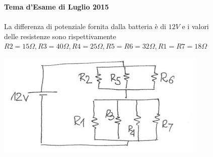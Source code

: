 \begin{figure}[h!]
\textbf{Tema d'Esame di Luglio 2015}\\ \\
La differenza di potenziale fornita dalla batteria è di $12V$ e i valori delle resistenze sono rispettivamente $R2=15\Omega, R3=40\Omega, R4=25\Omega, R5=R6=32\Omega, R1=R7=18\Omega$
\begin{center}
		\includegraphics[scale=1]{ES5/LUG052015.jpg}
	\end{center}
\end{figure}